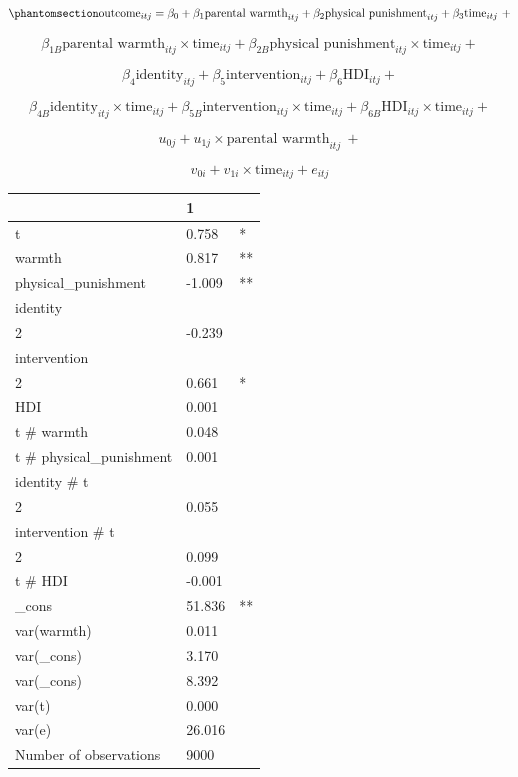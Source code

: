 \documentclass[
  letterpaper,
  DIV=11,
  numbers=noendperiod]{scrreprt}
\begin{document}
\begin{equation}\phantomsection\label{eq-MLM-longitudinal}{\text{outcome}_{itj} = \beta_0 + \beta_1 \text{parental warmth}_{itj} + \beta_2 \text{physical punishment}_{itj} + \beta_3 \text{time}_{itj} \ + }\end{equation}

\[\beta_{1B} \text{parental warmth}_{itj} \times \text{time}_{itj} + \beta_{2B} \text{physical punishment}_{itj} \times \text{time}_{itj} +\]

\[\beta_4 \text{identity}_{itj} + \beta_5 \text{intervention}_{itj} + \beta_6 \text{HDI}_{itj} +\]

\[\beta_{4B} \text{identity}_{itj} \times \text{time}_{itj} + \beta_{5B} \text{intervention}_{itj} \times \text{time}_{itj} + \beta_{6B} \text{HDI}_{itj} \times \text{time}_{itj} +\]

\[u_{0j} + u_{1j} \times \text{parental warmth}_{itj} \ + \]

\[v_{0i} + v_{1i} \times \text{time}_{itj} + e_{itj}\]

\begin{longtable}[]{@{}lll@{}}
\toprule\noalign{}
& 1 & \\
\midrule\noalign{}
\endhead
\bottomrule\noalign{}
\endlastfoot
t & 0.758 & * \\
warmth & 0.817 & ** \\
physical\_punishment & -1.009 & ** \\
identity & & \\
2 & -0.239 & \\
intervention & & \\
2 & 0.661 & * \\
HDI & 0.001 & \\
t \# warmth & 0.048 & \\
t \# physical\_punishment & 0.001 & \\
identity \# t & & \\
2 & 0.055 & \\
intervention \# t & & \\
2 & 0.099 & \\
t \# HDI & -0.001 & \\
\_cons & 51.836 & ** \\
var(warmth) & 0.011 & \\
var(\_cons) & 3.170 & \\
var(\_cons) & 8.392 & \\
var(t) & 0.000 & \\
var(e) & 26.016 & \\
Number of observations & 9000 & \\
\end{longtable}
\end{document}
